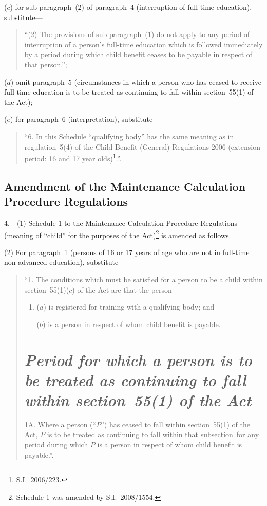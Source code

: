 \documentclass[12pt,a4paper]{article}
\begin{document}
\begin{enumerate}
($c$) for sub-paragraph~(2) of paragraph~4 (interruption of full-time education), substitute—
\begin{quotation}
“(2) The provisions of sub-paragraph~(1) do not apply to any period of interruption of a person’s full-time education which is followed immediately by a period during which child benefit ceases to be payable in respect of that person.”;
\end{quotation}

($d$) omit paragraph~5 (circumstances in which a person who has ceased to receive full-time education is to be treated as continuing to fall within section~55(1) of the Act);

($e$) for paragraph~6 (interpretation), substitute—
\begin{quotation}
“6.  In this Schedule “qualifying body” has the same meaning as in regulation~5(4) of the Child Benefit (General) Regulations 2006 (extension period: 16 and 17 year olds)\footnote{S.I.~2006/223.}.”.
\end{quotation}
\end{enumerate}

\subsection[4. Amendment of the Maintenance Calculation Procedure Regulations]{Amendment of the Maintenance Calculation Procedure Regulations}

4.---(1)  Schedule 1 to the Maintenance Calculation Procedure Regulations (meaning of “child” for the purposes of the Act)\footnote{Schedule 1 was amended by S.I.~2008/1554.} is amended as follows.

(2) For paragraph~1 (persons of 16 or 17 years of age who are not in full-time non-advanced education), substitute—
\begin{quotation}
“1.  The conditions which must be satisfied for a person to be a child within section~55(1)($c$)  of the Act are that the person—
\begin{enumerate}\item[]
($a$) is registered for training with a qualifying body; and

($b$) is a person in respect of whom child benefit is payable.
\end{enumerate}

\section*{\itshape\sloppy Period for which a person is to be treated as continuing to fall within section~55(1) of the Act}

1A.  Where a person (“$P$”) has ceased to fall within section~55(1) of the Act, $P$ is to be treated as continuing to fall within that subsection~for any period during which $P$ is a person in respect of whom child benefit is payable.”.
\end{quotation}
\end{document}
